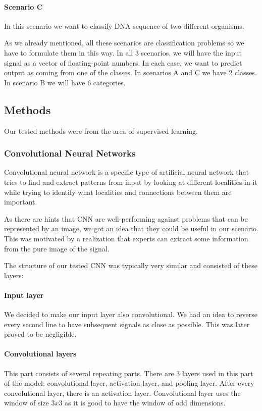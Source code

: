 \paragraph{Scenario C} In this scenario we want to classify DNA sequence of two
different organisms.

As we already mentioned, all these scenarios are classification problems so we have
to formulate them in this way. In all 3 scenarios, we will have the input signal as a
vector of floating-point numbers. In each case, we want to predict output as coming
from one of the classes. In scenarios A and C we have 2 classes. In scenario B we
will have 6 categories.

\subsection{Methods}

Our tested methods were from the area of supervised learning.

\subsubsection{Convolutional Neural Networks}

Convolutional neural network is a specific type of artificial neural network that
tries to find and extract patterns from input by looking at different localities
in it while trying to identify what localities and connections between them
are important.

As there are hints that CNN are well-performing against problems that can be
represented by an image, we got an idea that they could be useful in our scenario.
This was motivated by a realization that experts can extract some information from
the pure image of the signal.

The structure of our tested CNN was typically very similar and consisted of these
layers:

\paragraph{Input layer}
We decided to make our input layer also convolutional. We had an idea to reverse
every second line to have subsequent signals as close as possible. This was later
proved to be negligible.

\paragraph{Convolutional layers}
This part consists of several repeating parts. There are 3 layers used in
this part of the model: convolutional layer, activation layer, and pooling layer.
After every convolutional layer, there is an activation layer. Convolutional layer uses
the window of size $3x3$ as it is good to have the window of odd dimensions.

